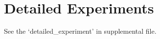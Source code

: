 \documentclass[a3paper]{article}
\newtheorem{theorem}{Theorem}
\newtheorem*{proof}{\it{Proof.}\rm}
\newcommand{\E}{\operatorname{\mathbb{E}}}
\newcommand{\pin}{p_{in}}
\newcommand{\pout}{p_{out}}
\newcommand{\pmix}{p_{mix}}
\begin{document}
%
%	

\section{Detailed Experiments}
See the `detailed\_experiment' in supplemental file. 






\end{document}

